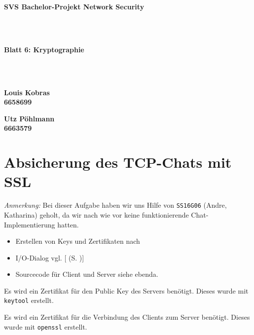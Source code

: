 \documentclass[twoside]{article}
\newcommand{\ttt}[1]{%
	\texttt{#1}%
}
\newcommand{\mref}[1]{[\nameref{#1} (S. \pageref{#1})]}
\begin{document}
\pagestyle{fancy}
\fancyhead{}
\fancyfoot{}

\begin{center}
\begin{Huge}
\textbf{SVS Bachelor-Projekt Network Security}
\end{Huge}\\\-\\
\begin{Large}
\textbf{Blatt 6: Kryptographie}
\end{Large}\\\-\\
\begin{minipage}[t]{0.48\textwidth}
\begin{center}\textbf{
	Louis Kobras\\
	6658699}
\end{center}
\end{minipage}
\begin{minipage}[t]{0.48\textwidth}
\begin{center}\textbf{
	Utz Pöhlmann\\
	6663579}
\end{center}
\end{minipage}
\end{center}


\section{Absicherung des TCP-Chats mit SSL}
	\label{sec:tcp}
		\textit{Anmerkung:} Bei dieser Aufgabe haben wir uns Hilfe von \ttt{SS16G06} (Andre, Katharina) geholt, da wir nach wie vor keine funktionierende Chat-Implementierung hatten.
		\begin{itemize}
			\item Erstellen von Keys und Zertifikaten nach \cite{keytool}
			\item I/O-Dialog vgl. \mref{keytool-dialog}
			\item Sourcecode für Client und Server siehe ebenda.
		\end{itemize}
		Es wird ein Zertifikat für den Public Key des Servers benötigt.
		Dieses wurde mit \ttt{keytool} erstellt.
		
		Es wird ein Zertifikat für die Verbindung des Clients zum Server benötigt.
		Dieses wurde mit \ttt{openssl} erstellt.
\end{document}
